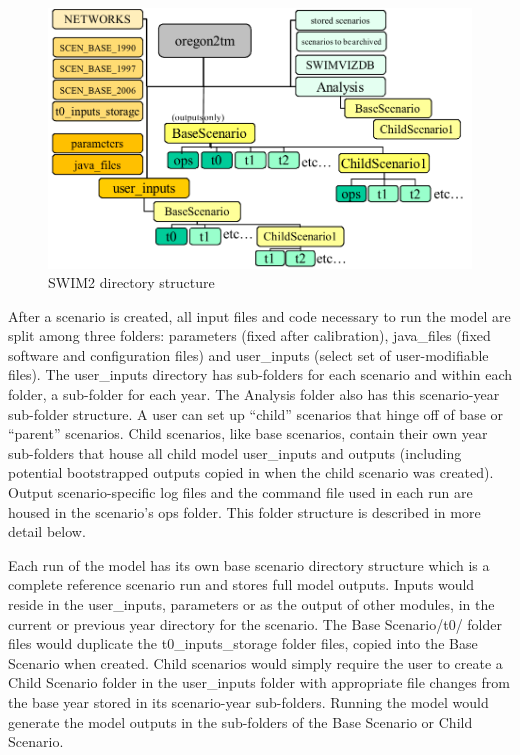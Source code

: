 \begin{figure}
\centering
\includegraphics[width=5in]{overview/directory-structure}
\caption{SWIM2 directory structure}
\label{fig:directory-structure}
\end{figure}

After a scenario is created, all input files and code necessary to run the model are split among three folders: parameters (fixed after calibration), java\_files (fixed software and configuration files) and user\_inputs (select set of user-modifiable files). The user\_inputs directory has sub-folders for each scenario and within each folder, a sub-folder for each year. The Analysis folder also has this scenario-year sub-folder structure. A user can set up ``child'' scenarios that hinge off of base or ``parent'' scenarios. Child scenarios, like base scenarios, contain their own year sub-folders that house all child model user\_inputs and outputs (including potential bootstrapped outputs copied in when the child scenario was created). Output scenario-specific log files and the command file used in each run are housed in the scenario's ops folder. This folder structure is described in more detail below.

Each run of the model has its own base scenario directory structure which is a complete reference scenario run and stores full model outputs. Inputs would reside in the user\_inputs, parameters or as the output of other modules, in the current or previous year directory for the scenario. The Base Scenario/t0/ folder files would duplicate the t0\_inputs\_storage folder files, copied into the Base Scenario when created. Child scenarios would simply require the user to create a Child Scenario folder in the user\_inputs folder with appropriate file changes from the base year stored in its scenario-year sub-folders. Running the model would generate the model outputs in the sub-folders of the Base Scenario or Child Scenario.

